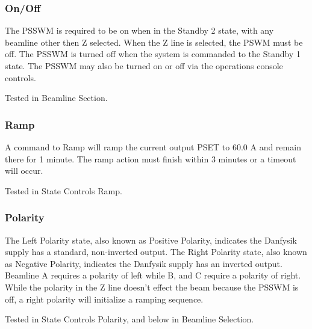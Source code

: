 \documentclass[11pt]{book}		%
\begin{document}
\begin{enumerate}
\color{black}

\subsubsection{On/Off} \label{sect:cyc-equip-ctl-beamline-swm-state-controls-on-off}

The PSSWM is required to be on when in the Standby 2 state, with any beamline other then Z selected.  When the Z line is selected, the PSWM must be off. The PSSWM is turned off when the system is commanded to the Standby 1 state. The PSSWM may also be turned on or off via the operations console controls.



\color{red}

Tested in Beamline Section.

\color{black}



\subsubsection{Ramp} \label{sect:cyc-equip-ctl-beamline-swm-state-controls-ramp}

A command to Ramp will ramp the current output PSET to 60.0 A and remain there for 1 minute.  The ramp action must finish within 3 minutes or a timeout will occur.


\color{red}

Tested in State Controls Ramp.

\color{black}


\subsubsection{Polarity} \label{sect:cyc-equip-ctl-beamline-swm-state-controls-polarity}

The Left Polarity state, also known as Positive Polarity, indicates the Danfysik supply has a standard, non-inverted output. The Right Polarity state, also known as Negative Polarity, indicates the Danfysik supply has an inverted output. Beamline A requires a polarity of left while B, and C require a polarity of right.  While the polarity in the Z line doesn't effect the beam because the PSSWM is off, a right polarity will initialize a ramping sequence.

\color{red}

Tested in State Controls Polarity, and below in Beamline Selection.

\color{black}

\end{enumerate}
\end{document}

